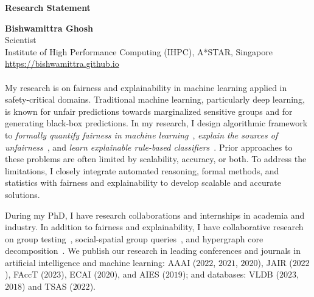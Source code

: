 \documentclass[10pt]{article}
\newcommand{\blue}[1]{\textcolor{blue}{#1}}
\begin{document}
	\begin{center}
		\large\textbf{Research Statement} 
	\end{center}
	\textbf{Bishwamittra Ghosh}\\		
	\noindent Scientist\\
	Institute of High Performance Computing (IHPC), A*STAR, Singapore\\
	\blue{\url{https://bishwamittra.github.io}}



	\paragraph{}
	My research is on fairness and explainability in machine learning applied in safety-critical domains. Traditional machine learning, particularly deep learning, is known for  unfair predictions towards marginalized sensitive groups and for generating black-box predictions. In my research, I design algorithmic framework to \textit{formally quantify fairness in machine learning}~\cite{ghosh2021justicia, ghosh2022algorithmic}, \textit{explain the sources of unfairness}~\cite{ghosh2022how}, and \textit{learn explainable rule-based classifiers}~\cite{ghosh22efficient, ghosh2019incremental, ghosh2020classification}. Prior approaches to these problems are often limited by scalability, accuracy, or both. To address the limitations, I closely integrate automated reasoning, formal methods, and statistics with fairness and explainability to develop scalable and accurate solutions.
	
	

	
	
	During my PhD, I have  research collaborations and internships in academia and industry. In addition to fairness and explainability, I have collaborative research on  group testing~\cite{ciampiconi2020maxsat}, social-spatial group queries~\cite{ghosh2018flexible, apon2021social}, and hypergraph core decomposition~\cite{arafat2023neighborhood}. We publish our research in leading conferences and journals in artificial intelligence and machine learning: AAAI ($2022$, $2021$, $2020$), JAIR ($2022$), FAccT ($2023$), ECAI ($2020$), and AIES ($2019$); and databases: VLDB ($2023$, $2018$) and TSAS ($2022$).
	
	
	
	
	
	
\end{document}
